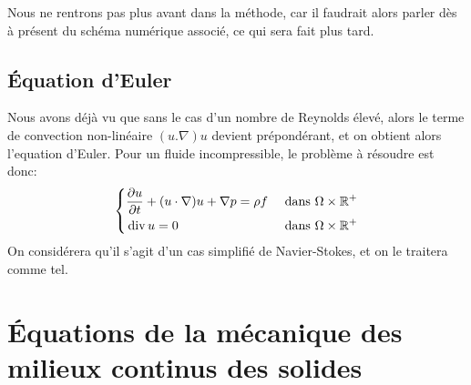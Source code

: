 Nous ne rentrons pas plus avant dans la méthode, car il faudrait alors parler dès à présent
du schéma numérique associé, ce qui sera fait plus tard.

\medskip
\subsection{Équation d'Euler}
Nous avons déjà vu que sans le cas d'un nombre de Reynolds
élevé, alors le terme de  convection non-linéaire $(u.\nabla)u$ devient prépondérant,
et on obtient alors l'equation d'Euler.
Pour un fluide incompressible, le problème à résoudre est donc:
\begin{equation}\left\{
\begin{aligned}
&\dfrac{\partial u}{\partial t} + (u\cdot\nabla) u + \nabla p = \rho f && \text{ dans } \Omega\times\mathbb R^+\\
&\operatorname{div} u = 0&& \text{ dans } \Omega\times\mathbb R^+
\end{aligned}\right.
\end{equation}
On considérera qu'il s'agit d'un cas simplifié de Navier-Stokes, et on le traitera
comme tel.

\medskip
\section{Équations de la mécanique des milieux continus des solides}
\medskip
